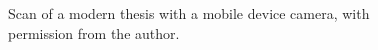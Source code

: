\documentclass[]{article}
\begin{document}
\begin{figure}
\begin{subfigure}[b]{0.425\textwidth}
     \end{subfigure}
     \hfill
     \begin{subfigure}[b]{0.425\textwidth}
         \centering
     \end{subfigure}
    \caption{Scan of a modern thesis with a mobile device camera, with permission from the author. }
    \label{fig:example_scanthesis}
\end{figure}
\end{document}
